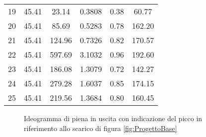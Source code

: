 \begin{table}[htbp]
\begin{tabular}{cS[table-format=2.2]S[table-format=3.2]S[table-format=1.4]S[table-format=1.2]S[table-format=3.2]}
19 & 45.41 & 23.14 & 0.3808 & 0.38 & 60.77 \\
20 & 45.41 & 85.69 & 0.5283 & 0.78 & 162.20 \\
21 & 45.41 & 124.96 & 0.7326 & 0.82 & 170.57 \\
22 & 45.41 & 597.69 & 3.1032 & 0.96 & 192.60 \\
23 & 45.41 & 186.08 & 1.3079 & 0.72 & 142.27 \\
24 & 45.41 & 279.28 & 1.6037 & 0.85 & 174.15 \\
25 & 45.41 & 219.56 & 1.3684 & 0.80 & 160.45 \\ \bottomrule
\end{tabular}
\end{table}

\begin{figure}[htbp]
    \centering
    \caption{Ideogramma di piena in uscita con indicazione del picco in riferimento allo scarico di figura \ref{fig:ProgettoBase}}
    \label{fig:IdeogrammaPiena}
\end{figure}   

